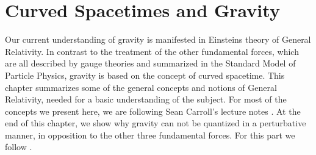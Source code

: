 \chapter{Curved Spacetimes and Gravity}\label{chap:GR}
Our current understanding of gravity is manifested in Einsteins theory of General Relativity. In contrast to the treatment of the other fundamental forces, which are all described by gauge theories and summarized in the Standard Model of Particle Physics, gravity is based on the concept of curved spacetime. This chapter summarizes some of the general concepts and notions of General Relativity, needed for a basic understanding of the subject. For most of the concepts we present here, we are following Sean Carroll's lecture notes \cite{CarrollGR}. At the end of this chapter, we show why gravity can not be quantized in a perturbative manner, in opposition to the other three fundamental forces. For this part we follow \cite{PawlowskiNPgaugeLecture}. 

